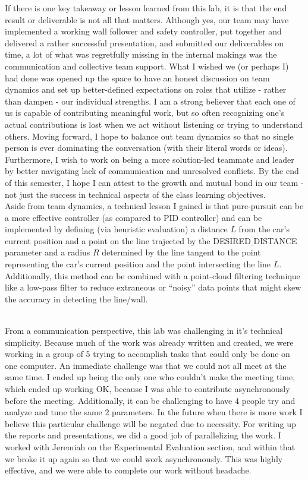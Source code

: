\documentclass{article}
\begin{document}
If there is one key takeaway or lesson learned from this lab, it is that the end result or deliverable is not all that matters. Although yes, our team may have implemented a working wall follower and safety controller, put together and delivered a rather successful presentation, and submitted our deliverables on time, a lot of what was regretfully missing in the internal makings was the communication and collective team support. What I wished we (or perhaps I) had done was opened up the space to have an honest discussion on team dynamics and set up better-defined expectations on roles that utilize - rather than dampen - our individual strengths. I am a strong believer that each one of us is capable of contributing meaningful work, but so often recognizing one’s actual contributions is lost when we act without listening or trying to understand others. Moving forward, I hope to balance out team dynamics so that no single person is ever dominating the conversation (with their literal words or ideas). Furthermore, I wish to work on being a more solution-led teammate and leader by better navigating lack of communication and unresolved conflicts. By the end of this semester, I hope I can attest to the growth and mutual bond in our team - not just the success in technical aspects of the class learning objectives. \\

Aside from team dynamics, a technical lesson I gained is that pure-pursuit can be a more effective controller (as compared to PID controller) and can be implemented by defining (via heuristic evaluation) a distance $L$ from the car’s current position and a point on the line trajected by the DESIRED$\_$DISTANCE parameter and a radius $R$ determined by the line tangent to the point representing the car’s current position and the point intersecting the line $L$. Additionally, this method can be combined with a point-cloud filtering technique like a low-pass filter to reduce extraneous or “noisy” data points that might skew the accuracy in detecting the line/wall.\\

\author{\textbf{Bill Kuhl}} \\

From a communication perspective, this lab was challenging in it's technical simplicity. Because much of the work was already written and created, we were working in a group of 5 trying to accomplish tasks that could only be done on one computer. An immediate challenge was that we could not all meet at the same time. I ended up being the only one who couldn't make the meeting time, which ended up working OK, because I was able to contribute asynchronously before the meeting. Additionally, it can be challenging to have 4 people try and analyze and tune the same 2 parameters. In the future when there is more work I believe this particular challenge will be negated due to necessity. For writing up the reports and presentations, we did a good job of parallelizing the work. I worked with Jeremiah on the Experimental Evaluation section, and within that we broke it up again so that we could work asynchronously. This was highly effective, and we were able to complete our work without headache.\\
\end{document}
